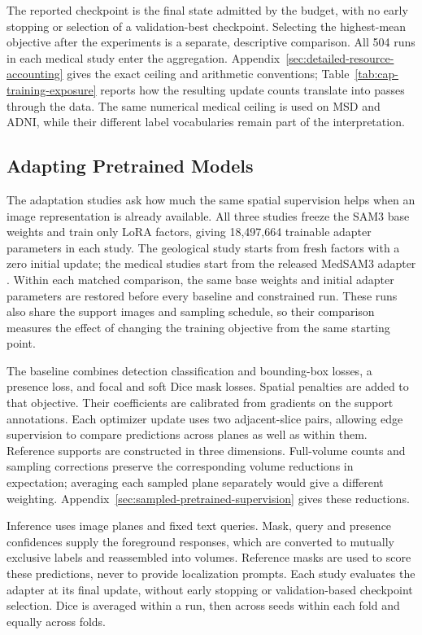 \documentclass[12pt,a4paper]{article}
\begin{document}
The reported checkpoint is the final state admitted by the budget, with
no early stopping or selection of a validation-best checkpoint. Selecting
the highest-mean objective after the experiments is a separate, descriptive
comparison. All 504 runs in each medical study enter the aggregation.
Appendix~\ref{sec:detailed-resource-accounting} gives the exact ceiling
and arithmetic conventions; Table~\ref{tab:cap-training-exposure} reports
how the resulting update counts translate into passes through the data.
The same numerical medical ceiling is used on MSD and ADNI, while their
different label vocabularies remain part of the interpretation.

\subsection{Adapting Pretrained Models}

The adaptation studies ask how much the same spatial supervision helps
when an image representation is already available. All three studies
freeze the SAM3 base weights and train only LoRA factors, giving
18,497,664 trainable adapter parameters in each study. The geological
study starts from fresh factors with a zero initial update; the medical
studies start from the released MedSAM3 adapter
\cite{carion2025sam3,liu2025medsam3}. Within each matched comparison, the
same base weights and initial adapter parameters are restored before
every baseline and constrained run. These runs also share the support
images and sampling schedule, so their comparison measures the effect
of changing the training objective from the same starting point.

The baseline combines detection classification and bounding-box losses,
a presence loss, and focal and soft Dice mask losses. Spatial penalties
are added to that objective. Their coefficients are calibrated from
gradients on the support annotations. Each optimizer update uses two
adjacent-slice pairs, allowing edge supervision to compare predictions
across planes as well as within them. Reference supports are constructed
in three dimensions. Full-volume counts and sampling corrections
preserve the corresponding volume reductions in expectation; averaging
each sampled plane separately would give a different weighting.
Appendix~\ref{sec:sampled-pretrained-supervision} gives these reductions.

Inference uses image planes and fixed text queries. Mask, query and
presence confidences supply the foreground responses, which are
converted to mutually exclusive labels and reassembled into volumes.
Reference masks are used to score these predictions, never to provide
localization prompts. Each study evaluates the adapter at its final
update, without early stopping or validation-based checkpoint selection.
Dice is averaged within a run, then across seeds within each fold and
equally across folds.
\end{document}
